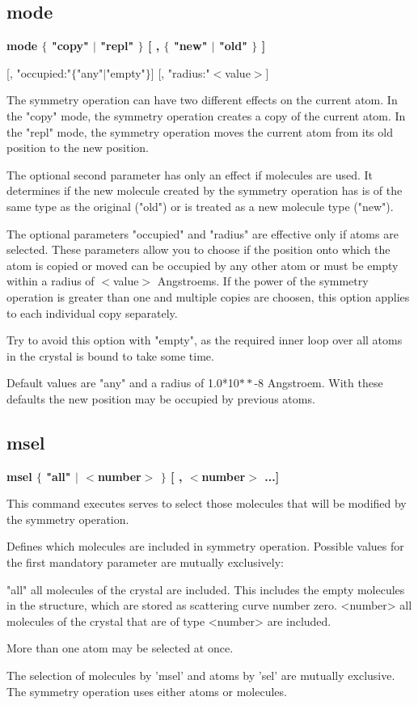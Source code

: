 \subsection*{mode}
{\bf mode $ \{$ "copy" $| $ "repl" $\} $ [ , $ \{$ "new" $| $ "old" $\} $ ] \par }
\vspace{3pt}
     [, "occupied:"$ \{$"any"$| $"empty"$\} $] 
     [, "radius:"$ <$value$> $] 
\par
The symmetry operation can have two different effects on the current 
atom. In the "copy" mode, the symmetry operation creates a copy of the 
current atom. In the "repl" mode, the symmetry operation moves the 
current atom from its old position to the new position. 
\par
The optional second parameter has only an effect if molecules are 
used. It determines if the new molecule created by the symmetry 
operation has is of the same type as the original ("old") or is 
treated as a new molecule type ("new"). 
\par
The optional parameters "occupied" and "radius" are effective 
only if atoms are selected. These parameters allow you to 
choose if the position onto which the atom is copied or moved 
can be occupied by any other atom or must be empty within a 
radius of $ <$value$> $ Angstroems. If the power of the symmetry 
operation is greater than one and multiple copies are choosen, this 
option applies to each individual copy separately. 
\par
Try to avoid this option with "empty", as the required inner 
loop over all atoms in the crystal is bound to take some time. 
\par
Default values are "any" and a radius of 1.0*10$**$-8 Angstroem. 
With these defaults the new position may be occupied by 
previous atoms. 
\subsection*{msel}
{\bf msel $ \{$ "all" $| $ $ <$number$> $ $\} $ [ , $ <$number$> $ ...] \par }
\par
\vspace{3pt}
This command executes serves to select 
those molecules that will be modified by the symmetry operation. 
\par
Defines which molecules are included in symmetry operation. Possible values 
for the first mandatory parameter are mutually exclusively: 
\par
\begin{MacVerbatim}
"all"     all molecules of the crystal are included.
          This includes the empty molecules in the structure, which are
          stored as scattering curve number zero.
<number>  all molecules of the crystal that are of type <number>
          are included.
\end{MacVerbatim}
More than one atom may be selected at once. 
\par
The selection of molecules by 'msel' and atoms by 'sel' are mutually 
exclusive. The symmetry operation uses either atoms or molecules. 
